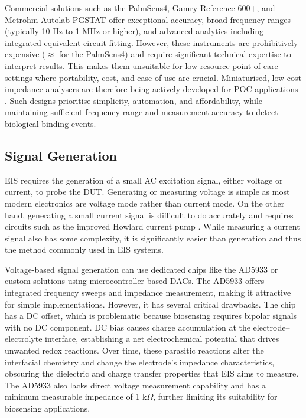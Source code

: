 Commercial solutions such as the PalmSens4, Gamry Reference 600+, and Metrohm Autolab PGSTAT offer exceptional accuracy, broad frequency ranges (typically 10 Hz to 1 MHz or higher), and advanced analytics including integrated equivalent circuit fitting. However, these instruments are prohibitively expensive ($\approx$  for the PalmSens4) and require significant technical expertise to interpret results. This makes them unsuitable for low-resource point-of-care settings where portability, cost, and ease of use are crucial. Miniaturised, low-cost impedance analysers are therefore being actively developed for POC applications \cite{buscagliaSimpleZLowCostPortable2023, al-aliDesignPortableLowCost2017, ibrahimCMOSTransimpedanceAmplifier}. Such designs prioritise simplicity, automation, and affordability, while maintaining sufficient frequency range and measurement accuracy to detect biological binding events.

\subsection{Signal Generation}
\Ac{EIS} requires the generation of a small AC excitation signal, either voltage or current, to probe the \ac{DUT}. Generating or measuring voltage is simple as most modern electronics are voltage mode rather than current mode. On the other hand, generating a small current signal is difficult to do accurately and requires circuits such as the improved Howlard current pump \cite{ImprovedHowlandCurrent2020}. While measuring a current signal also has some complexity, it is significantly easier than generation and thus the method commonly used in \ac{EIS} systems.

Voltage-based signal generation can use dedicated chips like the AD5933 or custom solutions using microcontroller-based \acp{DAC}. The AD5933 offers integrated frequency sweeps and impedance measurement, making it attractive for simple implementations. However, it has several critical drawbacks. The chip has a DC offset, which is problematic because biosensing requires bipolar signals with no DC component. DC bias causes charge accumulation at the electrode–electrolyte interface, establishing a net electrochemical potential that drives unwanted redox reactions. Over time, these parasitic reactions alter the interfacial chemistry and change the electrode's impedance characteristics, obscuring the dielectric and charge transfer properties that \ac{EIS} aims to measure. The AD5933 also lacks direct voltage measurement capability and has a minimum measurable impedance of 1 k$\Omega$, further limiting its suitability for biosensing applications.

